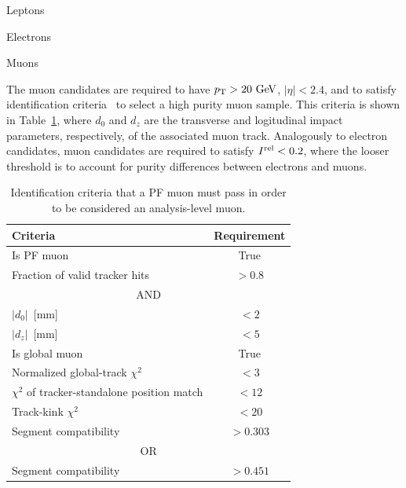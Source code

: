 \begin{section}{Leptons}
\begin{subsection}{Electrons}
\end{subsection}

\begin{subsection}{Muons}

The muon candidates are required to have $p_\mathrm{T} > 20~\mathrm{Ge\kern -0.1em V}$, $|\eta| < 2.4$, and to satisfy identification criteria~\cite{muon_id} to select a high purity muon sample.
This criteria is shown in Table~\ref{tab:muon_id}, where $d_0$ and $d_z$ are the transverse and logitudinal impact parameters, respectively, of the associated muon track.
Analogously to electron candidates, muon candidates are required to satisfy $I^{\mathrm{rel}} < 0.2$, where the looser threshold is to account for purity differences between electrons and muons.

\begin{table}[tb!]
\centering
\begin{tabular}{l|c}
\hline \hline
Criteria                                       &  Requirement \\
\hline
Is PF muon                                     &  True        \\
Fraction of valid tracker hits                 &  $> 0.8$     \\
\hline
\multicolumn{2}{c}{\textsc{AND}}                                       \\      
$|d_0|$~[mm]                                   &  $< 2$       \\
$|d_z|$~[mm]                                   &  $< 5$       \\
Is global muon                                 &  True        \\
Normalized global-track $\chi^2$               &  $< 3$       \\
$\chi^2$ of tracker-standalone position match  &  $< 12$      \\
Track-kink $\chi^2$                            &  $< 20$      \\
Segment compatibility                          &  $> 0.303$   \\
\multicolumn{2}{c}{\textsc{OR}}                                        \\
Segment compatibility                          &  $> 0.451$   \\
\hline\hline
\end{tabular}
\caption{Identification criteria that a PF muon must pass in order to be considered an analysis-level muon.}
\label{tab:muon_id}
\end{table}


\end{subsection}
\end{section}
